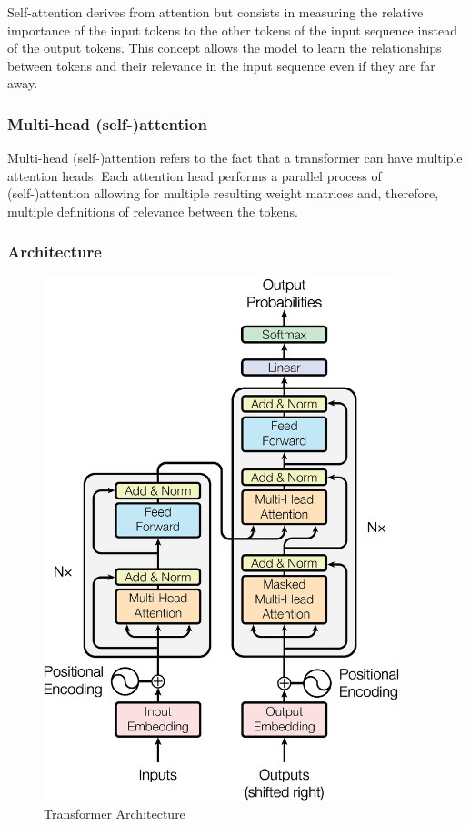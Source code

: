 Self-attention derives from attention but consists in measuring the relative importance of the input tokens to the other tokens of the input sequence instead of the output tokens. This concept allows the model to learn the relationships between tokens and their relevance in the input sequence even if they are far away.
 
\subsubsection{Multi-head (self-)attention}

Multi-head (self-)attention refers to the fact that a transformer can have multiple attention heads. Each attention head performs a parallel process of (self-)attention allowing for multiple resulting weight matrices and, therefore, multiple definitions of relevance between the tokens.

\subsubsection{Architecture}

\begin{figure}[h]
\centerline{\includegraphics[height=6in]{figs/transformer.jpg}}
\caption[Transformer Architecture]{Transformer Architecture \cite{Vaswani2017}}
\label{fig:transformer_arch}
\end{figure}
